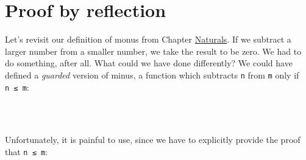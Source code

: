 \hypertarget{Decidable-proof-by-reflection}{%
\section{Proof by reflection}\label{Decidable-proof-by-reflection}}

Let's revisit our definition of monus from Chapter
\protect\hyperlink{Naturals}{Naturals}. If we subtract a larger number
from a smaller number, we take the result to be zero. We had to do
something, after all. What could we have done differently? We could have
defined a \emph{guarded} version of minus, a function which subtracts
\texttt{n} from \texttt{m} only if \texttt{n\ ≤\ m}:

\begin{fence}
\begin{code}%
\>[0]\AgdaSpace{}%
\AgdaSymbol{:}\AgdaSpace{}%
\AgdaSymbol{(}\AgdaSpace{}%
\AgdaSpace{}%
\AgdaSymbol{:}\AgdaSpace{}%
\AgdaSymbol{)}\AgdaSpace{}%
\AgdaSymbol{(}\AgdaSpace{}%
\AgdaSymbol{:}\AgdaSpace{}%
\AgdaSpace{}%
\AgdaSpace{}%
\AgdaSymbol{)}\AgdaSpace{}%
\AgdaSpace{}%
\<%
\\
\>[0]\AgdaSpace{}%
%
\>[14]%
\>[22]\AgdaSymbol{\AgdaUnderscore{}}%
\>[32]\AgdaSymbol{=}\AgdaSpace{}%
\<%
\\
\>[0]\AgdaSpace{}%
\AgdaSymbol{(}\AgdaSpace{}%
\AgdaSymbol{)}\AgdaSpace{}%
\AgdaSymbol{(}\AgdaSpace{}%
\AgdaSymbol{)}\AgdaSpace{}%
\AgdaSymbol{(}\AgdaSpace{}%
\AgdaSymbol{)}\AgdaSpace{}%
\AgdaSymbol{=}\AgdaSpace{}%
\AgdaSpace{}%
\AgdaSpace{}%
\AgdaSpace{}%
\<%
\end{code}
\end{fence}

Unfortunately, it is painful to use, since we have to explicitly provide
the proof that \texttt{n\ ≤\ m}:

\begin{fence}
\begin{code}%
\>[0]\AgdaFunction{\AgdaUnderscore{}}\AgdaSpace{}%
\AgdaSymbol{:}\AgdaSpace{}%
\AgdaSpace{}%
\AgdaSpace{}%
\AgdaSpace{}%
\AgdaSymbol{(}\AgdaSpace{}%
\AgdaSymbol{(}\AgdaSpace{}%
\AgdaSymbol{(}\AgdaSpace{}%
\AgdaSymbol{)))}\AgdaSpace{}%
\AgdaSpace{}%
\<%
\\
\>[0]\AgdaSymbol{\AgdaUnderscore{}}\AgdaSpace{}%
\AgdaSymbol{=}\AgdaSpace{}%
\<%
\end{code}
\end{fence}

